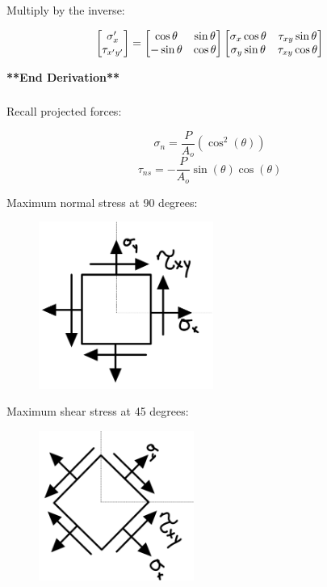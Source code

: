 \noindent Multiply by the inverse:

\[\begin{bmatrix}
\sigma_{x}' \\
\tau_{x'y'}
\end{bmatrix} =
\begin{bmatrix}
\rm\cos\theta & \rm\sin\theta \\
-\rm\sin\theta & \rm\cos\theta
\end{bmatrix}
\begin{bmatrix}
\sigma_{x}\rm\cos\theta & \tau_{xy}\rm\sin\theta \\
\sigma_{y}\rm\sin\theta & \tau_{xy}\rm\cos\theta
\end{bmatrix}
\]

\noindent \textbf{**End Derivation**}

\subsubsection{}

\noindent Recall projected forces:

\[\sigma_n = \frac{P}{A_o}(\cos^2(\theta))\] 
\[\tau_{ns} = -\frac{P}{A_o}\sin(\theta)\cos(\theta)\]

\noindent Maximum normal stress at 90 degrees: 
\begin{figure}[!h]
\centering
\includegraphics[angle=0, width=2.25in]{Stress Transformation-Figures/Max Normal.png}
\vspace{-2mm}
\caption{\small {}}
\vspace{-3mm}
\label{Fig:MaxNormal}
\end{figure}


\noindent Maximum shear stress at 45 degrees: \begin{figure}[!h]
\centering
\includegraphics[angle=0, width=2in]{Stress Transformation-Figures/Max Shear.png}
\vspace{-2mm}
\caption{\small {}}
\vspace{-3mm}
\label{Fig:MaxShear}
\end{figure}


